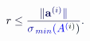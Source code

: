 \documentclass[12pt]{article}
\begin{document}
\makeatletter
\renewcommand*{\@textcolor}[3]{%
  \protect\leavevmode
  \begingroup
    \color#1{#2}#3%
  \endgroup
}
\makeatother
\begin{displaymath}
\mathcolor[RGB]{0,0,15}{r} \mathcolor[RGB]{0,0,30}{\leq} \mathcolor[RGB]{0,0,45}{\frac { \mathcolor[RGB]{0,0,60}{\|} \mathbf { \mathcolor[RGB]{0,0,75}{a} } ^ { \mathcolor[RGB]{0,0,90}{(} \mathcolor[RGB]{0,0,105}{i} \mathcolor[RGB]{0,0,120}{)} } \mathcolor[RGB]{0,0,135}{\|} } { \mathcolor[RGB]{0,0,150}{\sigma} _ { \mathcolor[RGB]{0,0,165}{\operatorname*} { \mathcolor[RGB]{0,0,180}{m} \mathcolor[RGB]{0,0,195}{i} \mathcolor[RGB]{0,0,210}{n} } } \mathcolor[RGB]{0,0,225}{(} \mathcolor[RGB]{0,0,240}{A} ^ { \mathcolor[RGB]{0,0,255}{(} \mathcolor[RGB]{0,15,0}{i} \mathcolor[RGB]{0,15,15}{)} } \mathcolor[RGB]{0,15,30}{)} } } \mathcolor[RGB]{0,15,45}{.}
\end{displaymath}
\end{document}
